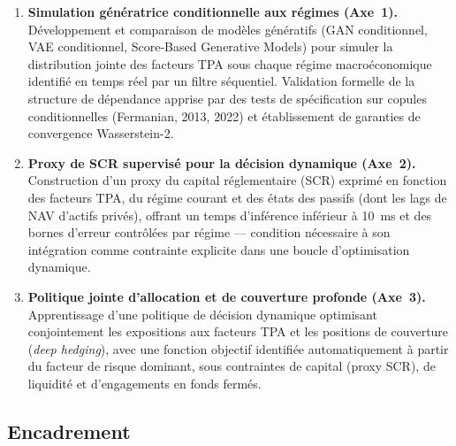 \documentclass[10pt,a4paper]{article}
\begin{document}
\begin{enumerate}[leftmargin=2em,itemsep=4pt]
  \item \textbf{Simulation génératrice conditionnelle aux régimes (Axe~1).}
        Développement et comparaison de modèles génératifs
        (GAN conditionnel, VAE conditionnel, Score-Based Generative Models)
        pour simuler la distribution jointe des facteurs TPA sous chaque régime
        macroéconomique identifié en temps réel par un filtre séquentiel.
        Validation formelle de la structure de dépendance apprise par des tests
        de spécification sur copules conditionnelles (Fermanian, 2013, 2022)
        et établissement de garanties de convergence Wasserstein-2.

  \item \textbf{Proxy de SCR supervisé pour la décision dynamique (Axe~2).}
        Construction d'un proxy du capital réglementaire (SCR)
        exprimé en fonction des facteurs TPA, du régime courant et des états
        des passifs (dont les lags de NAV d'actifs privés), offrant un temps
        d'inférence inférieur à 10~ms et des bornes d'erreur contrôlées
        par régime --- condition nécessaire à son intégration comme contrainte
        explicite dans une boucle d'optimisation dynamique.

  \item \textbf{Politique jointe d'allocation et de couverture profonde (Axe~3).}
        Apprentissage d'une politique de décision dynamique optimisant
        conjointement les expositions aux facteurs TPA et les positions de
        couverture (\textit{deep hedging}), avec une fonction objectif
        identifiée automatiquement à partir du facteur de risque dominant,
        sous contraintes de capital (proxy SCR), de liquidité et d'engagements
        en fonds fermés.
\end{enumerate}

\subsection{Encadrement}
\end{document}
